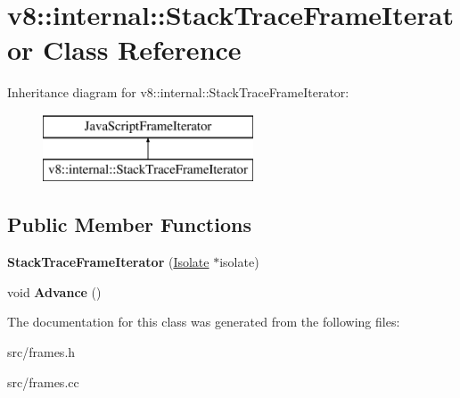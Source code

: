 \hypertarget{classv8_1_1internal_1_1_stack_trace_frame_iterator}{}\section{v8\+:\+:internal\+:\+:Stack\+Trace\+Frame\+Iterator Class Reference}
\label{classv8_1_1internal_1_1_stack_trace_frame_iterator}
Inheritance diagram for v8\+:\+:internal\+:\+:Stack\+Trace\+Frame\+Iterator\+:\begin{figure}[H]
\begin{center}
\leavevmode
\includegraphics[height=2.000000cm]{classv8_1_1internal_1_1_stack_trace_frame_iterator}
\end{center}
\end{figure}
\subsection*{Public Member Functions}
\begin{DoxyCompactItemize}
\item 
\hypertarget{classv8_1_1internal_1_1_stack_trace_frame_iterator_a327aa85383042c2d829611adc885193f}{}{\bfseries Stack\+Trace\+Frame\+Iterator} (\hyperlink{classv8_1_1internal_1_1_isolate}{Isolate} $\ast$isolate)\label{classv8_1_1internal_1_1_stack_trace_frame_iterator_a327aa85383042c2d829611adc885193f}

\item 
\hypertarget{classv8_1_1internal_1_1_stack_trace_frame_iterator_a37046bd215d8c31c8fa5c92a80808732}{}void {\bfseries Advance} ()\label{classv8_1_1internal_1_1_stack_trace_frame_iterator_a37046bd215d8c31c8fa5c92a80808732}

\end{DoxyCompactItemize}


The documentation for this class was generated from the following files\+:\begin{DoxyCompactItemize}
\item 
src/frames.\+h\item 
src/frames.\+cc\end{DoxyCompactItemize}
